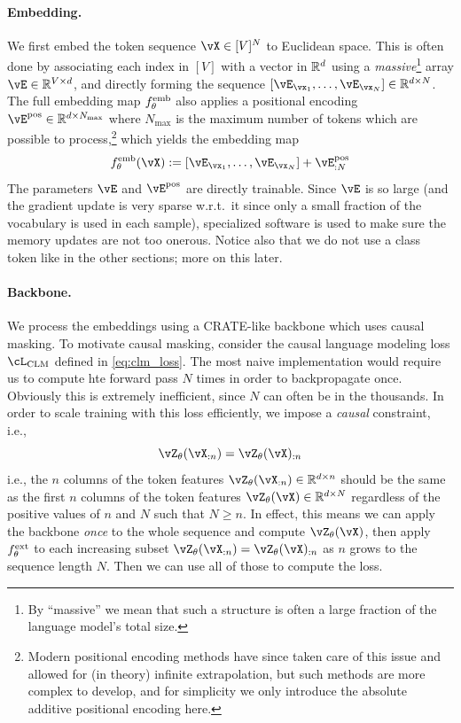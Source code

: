 \documentclass[../../book-main.tex]{subfiles}
\begin{document}
\paragraph{Embedding.} We first embed the token sequence \(\vX \in [V]^{N}\) to Euclidean space. This is often done by associating each index in \([V]\) with a vector in \(\mathbb{R}^{d}\) using a \textit{massive}\footnote{By ``massive'' we mean that such a structure is often a large fraction of the language model's total size.} array \(\vE \in \R^{V \times d}\), and directly forming the sequence \([\vE_{\vx_{1}}, \dots, \vE_{\vx_{N}}] \in \R^{d \times N}\). The full embedding map \(f_{\theta}^{\mathrm{emb}}\) also applies a positional encoding \(\vE^{\pos} \in \R^{d  \times N_{\max}}\) where \(N_{\max}\) is the maximum number of tokens which are possible to process,\footnote{Modern positional encoding methods have since taken care of this issue and allowed for (in theory) infinite extrapolation, but such methods are more complex to develop, and for simplicity we only introduce the absolute additive positional encoding here.} which yields the embedding map 
\begin{equation}
    f_{\theta}^{\emb}(\vX) := [\vE_{\vx_{1}}, \dots, \vE_{\vx_{N}}] + \vE_{:N}^{\pos}
\end{equation}
The parameters \(\vE\) and \(\vE^{\pos}\) are directly trainable. Since \(\vE\) is so large (and the gradient update is very sparse w.r.t.~it since only a small fraction of the vocabulary is used in each sample), specialized software is used to make sure the memory updates are not too onerous. Notice also that we do not use a class token like in the other sections; more on this later.

\paragraph{Backbone.} We process the embeddings using a CRATE-like backbone which uses causal masking. To motivate causal masking, consider the causal language modeling loss \(\cL_{\mathrm{CLM}}\) defined in \eqref{eq:clm_loss}. The most naive implementation would require us to compute hte forward pass \(N\) times in order to backpropagate once. Obviously this is extremely inefficient, since \(N\) can often be in the thousands. In order to scale training with this loss efficiently, we impose a \textit{causal} constraint, i.e.,
\begin{equation}\label{eq:causal_backbone_def}
    \vZ_{\theta}(\vX_{:n}) = \vZ_{\theta}(\vX)_{:n}
\end{equation}
i.e., the \(n\) columns of the token features \(\vZ_{\theta}(\vX_{:n}) \in \R^{d \times n}\) should be the same as the first \(n\) columns of the token features \(\vZ_{\theta}(\vX) \in \R^{d \times N}\) regardless of the positive values of \(n\) and \(N\) such that \(N \geq n\). In effect, this means we can apply the backbone \textit{once} to the whole sequence and compute \(\vZ_{\theta}(\vX)\), then apply \(f_{\theta}^{\mathrm{ext}}\) to each increasing subset \(\vZ_{\theta}(\vX_{:n}) = \vZ_{\theta}(\vX)_{:n}\) as \(n\) grows to the sequence length \(N\). Then we can use all of those to compute the loss.
\end{document}
